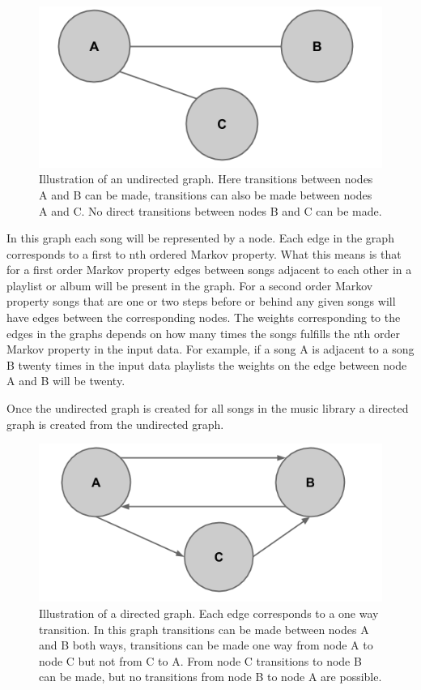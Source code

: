 \documentclass[a4paper,11pt]{kth-mag}
\begin{document}
\begin{figure}
\centering
\includegraphics[scale=0.4]{images/UGM.png}
\caption{Illustration of an undirected graph. Here transitions between nodes A and B can be made, transitions can also be made between nodes A and C. No direct transitions between nodes B and C can be made.}
\end{figure}

In this graph each song will be represented by a node. Each edge in the graph corresponds to a first to nth ordered Markov property. What this means is that for a first order Markov property edges between songs adjacent to each other in a playlist or album will be present in the graph. For a second order Markov property songs that are one or two steps before or behind any given songs will have edges between the corresponding nodes. The weights corresponding to the edges in the graphs depends on how many times the songs fulfills the nth order Markov property in the input data. For example, if a song A is adjacent to a song B twenty times in the input data playlists the weights on the edge between node A and B will be twenty.

  Once the undirected graph is created for all songs in the music library a directed graph is created from the undirected graph.
  
\begin{figure}
\centering
\includegraphics[scale=0.4]{images/DGM.png}
\caption{Illustration of a directed graph. Each edge corresponds to a one way transition. In this graph transitions can be made between nodes A and B both ways, transitions can be made one way from node A to node C but not from C to A. From node C transitions to node B can be made, but no transitions from node B to node A are possible.}
\end{figure}  
  
\end{document}
